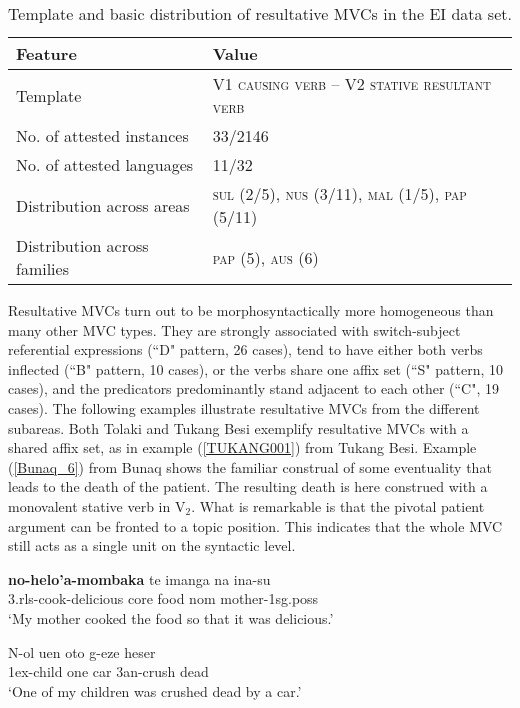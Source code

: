 \begin{table}


\begin{tabular}{ll}
\lsptoprule
Feature&Value\tabularnewline
\hline
Template&V1 \textsc{causing verb} -- V2 \textsc{stative resultant verb}\tabularnewline
No. of attested instances& 33/2146 \tabularnewline
No. of attested languages& 11/32 \tabularnewline
Distribution across areas& \textsc{sul} (2/5), \textsc{nus} (3/11), \textsc{mal} (1/5), \textsc{pap} (5/11) \tabularnewline
Distribution across families& \textsc{pap} (5), \textsc{aus} (6) \tabularnewline
\hline
\end{tabular}
\caption[Template and basic distribution of resultative MVCs]{Template and basic distribution of resultative MVCs in the EI data set. }
\label{table:resultative}
\end{table}


Resultative MVCs turn out to be morphosyntactically more homogeneous than many other MVC types. They are strongly associated with switch-subject referential expressions (``D" pattern, 26 cases), tend to have either both verbs inflected (``B" pattern, 10 cases), or the verbs share one affix set (``S" pattern, 10 cases), and the predicators predominantly stand adjacent to each other (``C", 19 cases). The following examples illustrate resultative MVCs from the different subareas. Both Tolaki and Tukang Besi exemplify resultative MVCs with a shared affix set, as in example (\ref{TUKANG001}) from Tukang Besi. Example (\ref{Bunaq_6}) from Bunaq shows the familiar construal of some eventuality that leads to the death of the patient. The resulting death is here construed with a monovalent stative verb in V$_2$. What is remarkable is that the pivotal patient argument can be fronted to a topic position. This indicates that the whole MVC still acts as a single unit on the syntactic level. 

\ea \label{TUKANG001}
\gll \textbf{no-helo'a-mombaka} te imanga na ina-su \\
\acs{3}.\acs{rls}-cook-delicious \acs{core} food \acs{nom} mother-\acs{1}\acs{sg}.\acs{poss} \\
\glft `My mother cooked the food so that it was delicious.' \\ 
\z
\xe

\ea \label{Bunaq_6}
\gll N-ol uen oto g-eze heser \\
1\acs{ex}-child one car 3\acs{an}-crush dead \\
\glft `One of my children was crushed dead by a car.’ \\ 
\z
\xe

